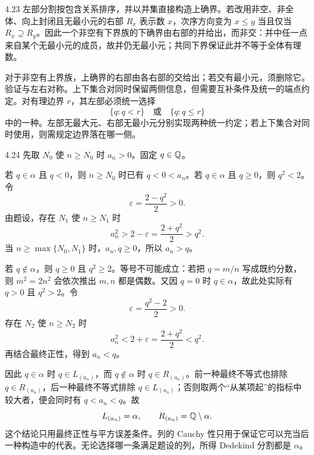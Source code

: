 \begin{solution}{4.23}
左部分割按包含关系排序，并以并集直接构造上确界。若改用非空、非全体、向上封闭且无最小元的右部 \(R_x\) 表示数 \(x\)，次序方向变为 \(x\le y\) 当且仅当 \(R_x\supseteq R_y\)。因此一个非空有下界族的下确界由右部的并给出，而非交：并中任一点来自某个无最小元的成员，故并仍无最小元；共同下界保证此并不等于全体有理数。

对于非空有上界族，上确界的右部由各右部的交给出；若交有最小元，须删除它。验证与左右对称。上下集合对同时保留两侧信息，但需要互补条件及统一的端点约定。对有理边界 \(r\)，其左部必须统一选择
\[
 \{q:q<r\}\quad\text{或}\quad\{q:q\le r\}
\]
中的一种。左部无最大元、右部无最小元分别实现两种统一约定；若上下集合对同时使用，则需规定边界落在哪一侧。
\end{solution}

\begin{solution}{4.24}
先取 \(N_0\) 使 \(n\ge N_0\) 时 \(a_n>0\)。固定
\(q\in\mathbb{Q}\)。

若 \(q\in\alpha\) 且 \(q<0\)，则 \(n\ge N_0\) 时已有
\(q<0<a_n\)。若 \(q\in\alpha\) 且 \(q\ge0\)，则
\(q^2<2\)。令
\[
  \varepsilon=\frac{2-q^2}{2}>0.
\]
由题设，存在 \(N_1\) 使 \(n\ge N_1\) 时
\[
  a_n^2>2-\varepsilon=\frac{2+q^2}{2}>q^2.
\]
当 \(n\ge\max\{N_0,N_1\}\) 时，\(a_n,q\ge0\)，所以
\(a_n>q\)。

若 \(q\notin\alpha\)，则 \(q\ge0\) 且 \(q^2\ge2\)。等号不可能成立：若把 \(q=m/n\) 写成既约分数，则
\(m^2=2n^2\) 会依次推出 \(m,n\) 都是偶数。又因 \(q=0\) 时
\(q\in\alpha\)，故此处实际有 \(q>0\) 且 \(q^2>2\)。令
\[
  \varepsilon=\frac{q^2-2}{2}>0.
\]
存在 \(N_2\) 使 \(n\ge N_2\) 时
\[
  a_n^2<2+\varepsilon=\frac{2+q^2}{2}<q^2.
\]
再结合最终正性，得到 \(a_n<q\)。

因此 \(q\in\alpha\) 时 \(q\in L_{(a_n)}\)，而
\(q\notin\alpha\) 时 \(q\in R_{(a_n)}\)。前一种最终不等式也排除
\(q\in R_{(a_n)}\)，后一种最终不等式排除 \(q\in L_{(a_n)}\)；否则取两个“从某项起”的指标中较大者，便会同时有
\(q<a_n<q\)。故
\[
  L_{(a_n)}=\alpha,
  \qquad
  R_{(a_n)}=\mathbb{Q}\setminus\alpha.
\]
这个结论只用最终正性与平方误差条件。列的 Cauchy 性只用于保证它可以充当后一种构造中的代表。无论选择哪一条满足题设的列，所得 Dedekind 分割都是 \(\alpha\)。
\end{solution}

